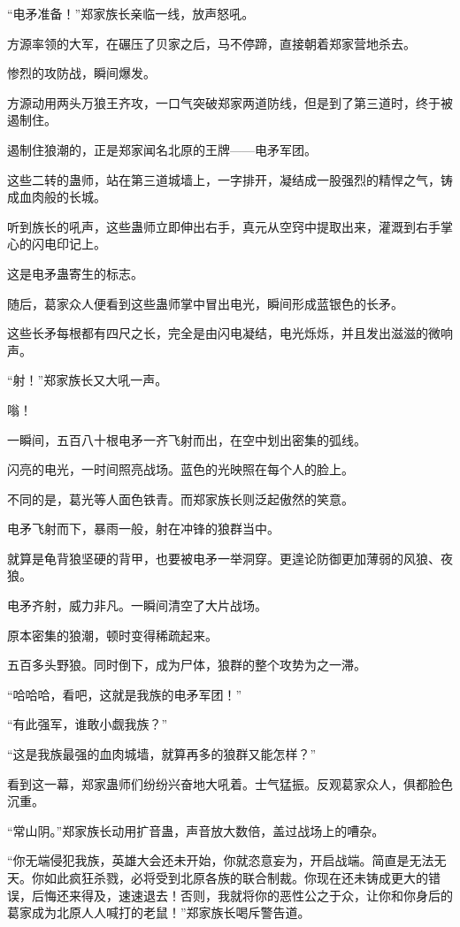 
\begin{this_body}

“电矛准备！”郑家族长亲临一线，放声怒吼。

方源率领的大军，在碾压了贝家之后，马不停蹄，直接朝着郑家营地杀去。

惨烈的攻防战，瞬间爆发。

方源动用两头万狼王齐攻，一口气突破郑家两道防线，但是到了第三道时，终于被遏制住。

遏制住狼潮的，正是郑家闻名北原的王牌——电矛军团。

这些二转的蛊师，站在第三道城墙上，一字排开，凝结成一股强烈的精悍之气，铸成血肉般的长城。

听到族长的吼声，这些蛊师立即伸出右手，真元从空窍中提取出来，灌溉到右手掌心的闪电印记上。

这是电矛蛊寄生的标志。

随后，葛家众人便看到这些蛊师掌中冒出电光，瞬间形成蓝银色的长矛。

这些长矛每根都有四尺之长，完全是由闪电凝结，电光烁烁，并且发出滋滋的微响声。

“射！”郑家族长又大吼一声。

嗡！

一瞬间，五百八十根电矛一齐飞射而出，在空中划出密集的弧线。

闪亮的电光，一时间照亮战场。蓝色的光映照在每个人的脸上。

不同的是，葛光等人面色铁青。而郑家族长则泛起傲然的笑意。

电矛飞射而下，暴雨一般，射在冲锋的狼群当中。

就算是龟背狼坚硬的背甲，也要被电矛一举洞穿。更遑论防御更加薄弱的风狼、夜狼。

电矛齐射，威力非凡。一瞬间清空了大片战场。

原本密集的狼潮，顿时变得稀疏起来。

五百多头野狼。同时倒下，成为尸体，狼群的整个攻势为之一滞。

“哈哈哈，看吧，这就是我族的电矛军团！”

“有此强军，谁敢小觑我族？”

“这是我族最强的血肉城墙，就算再多的狼群又能怎样？”

看到这一幕，郑家蛊师们纷纷兴奋地大吼着。士气猛振。反观葛家众人，俱都脸色沉重。

“常山阴。”郑家族长动用扩音蛊，声音放大数倍，盖过战场上的嘈杂。

“你无端侵犯我族，英雄大会还未开始，你就恣意妄为，开启战端。简直是无法无天。你如此疯狂杀戮，必将受到北原各族的联合制裁。你现在还未铸成更大的错误，后悔还来得及，速速退去！否则，我就将你的恶性公之于众，让你和你身后的葛家成为北原人人喊打的老鼠！”郑家族长喝斥警告道。


\end{this_body}
